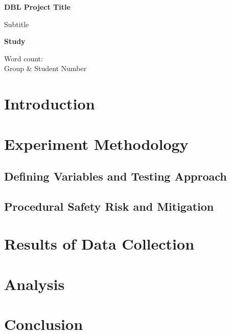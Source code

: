 \documentclass[a4paper,12pt]{extarticle}
\begin{document}
\begin{titlepage}
    \begin{center}
        \vspace*{1cm}
            
        \Huge
        \textbf{DBL Project Title}
            
        \vspace{1cm}
        \LARGE
        Subtitle
        \vspace{4cm}
            
        \textbf{Study}
            
        \vfill
        
        \Large
        Word count:\\
        Group \& Student Number\\
    \end{center}
\end{titlepage}

\tableofcontents
\newpage

\section{Introduction}

\section{Experiment Methodology}

\subsection{Defining Variables and Testing Approach}

\subsection{Procedural Safety Risk and Mitigation}

\section{Results of Data Collection}

\section{Analysis}

\section{Conclusion}
\end{document}
